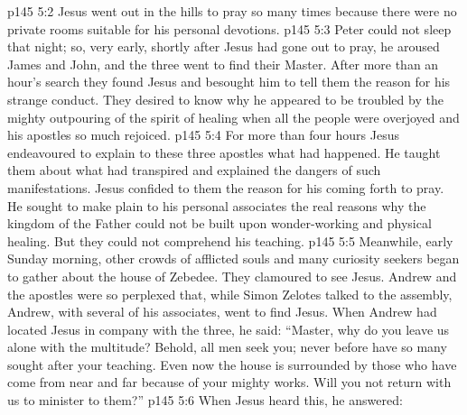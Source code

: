 \vs p145 5:2 Jesus went out in the hills to pray so many times because there were no private rooms suitable for his personal devotions.
\vs p145 5:3 Peter could not sleep that night; so, very early, shortly after Jesus had gone out to pray, he aroused James and John, and the three went to find their Master. After more than an hour’s search they found Jesus and besought him to tell them the reason for his strange conduct. They desired to know why he appeared to be troubled by the mighty outpouring of the spirit of healing when all the people were overjoyed and his apostles so much rejoiced.
\vs p145 5:4 For more than four hours Jesus endeavoured to explain to these three apostles what had happened. He taught them about what had transpired and explained the dangers of such manifestations. Jesus confided to them the reason for his coming forth to pray. He sought to make plain to his personal associates the real reasons why the kingdom of the Father could not be built upon wonder\hyp{}working and physical healing. But they could not comprehend his teaching.
\vs p145 5:5 Meanwhile, early Sunday morning, other crowds of afflicted souls and many curiosity seekers began to gather about the house of Zebedee. They clamoured to see Jesus. Andrew and the apostles were so perplexed that, while Simon Zelotes talked to the assembly, Andrew, with several of his associates, went to find Jesus. When Andrew had located Jesus in company with the three, he said: “Master, why do you leave us alone with the multitude? Behold, all men seek you; never before have so many sought after your teaching. Even now the house is surrounded by those who have come from near and far because of your mighty works. Will you not return with us to minister to them?”
\vs p145 5:6 When Jesus heard this, he answered: 
